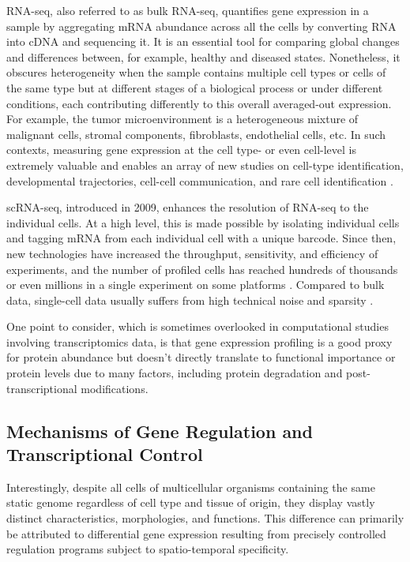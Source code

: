RNA-seq, also referred to as bulk RNA-seq, quantifies gene expression in a sample by aggregating mRNA abundance across all the cells by converting RNA into cDNA and sequencing it. It is an essential tool for comparing global changes and differences between, for example, healthy and diseased states. Nonetheless, it obscures heterogeneity when the sample contains multiple cell types or cells of the same type but at different stages of a biological process or under different conditions, each contributing differently to this overall averaged-out expression. For example, the tumor microenvironment is a heterogeneous mixture of malignant cells, stromal components, fibroblasts, endothelial cells, etc. In such contexts, measuring gene expression at the cell type- or even cell-level is extremely valuable and enables an array of new studies on cell-type identification, developmental trajectories, cell-cell communication, and rare cell identification \cite{tirosh2016dissecting, puram2017single}.

scRNA-seq, introduced in 2009, enhances the resolution of RNA-seq to the individual cells. At a high level, this is made possible by isolating individual cells and tagging mRNA from each individual cell with a unique barcode. Since then, new technologies have increased the throughput, sensitivity, and efficiency of experiments, and the number of profiled cells has reached hundreds of thousands or even millions in a single experiment on some platforms \cite{zheng2017massively}. Compared to bulk data, single-cell data usually suffers from high technical noise and sparsity \cite{hicks2018missing}.

One point to consider, which is sometimes overlooked in computational studies involving transcriptomics data, is that gene expression profiling is a good proxy for protein abundance but doesn’t directly translate to functional importance or protein levels due to many factors, including protein degradation and post-transcriptional modifications. 



\subsection*{Mechanisms of Gene Regulation and Transcriptional Control}
Interestingly, despite all cells of multicellular organisms containing the same static genome regardless of cell type and tissue of origin, they display vastly distinct characteristics, morphologies, and functions. This difference can primarily be attributed to differential gene expression resulting from precisely controlled regulation programs subject to spatio-temporal specificity. 

